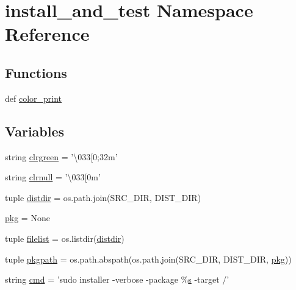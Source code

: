 \hypertarget{namespaceinstall__and__test}{}\section{install\+\_\+and\+\_\+test Namespace Reference}
\label{namespaceinstall__and__test}
\subsection*{Functions}
\begin{DoxyCompactItemize}
\item 
def \hyperlink{namespaceinstall__and__test_ae5a3426c3e84c2b77e7186f16f19b967}{color\+\_\+print}
\end{DoxyCompactItemize}
\subsection*{Variables}
\begin{DoxyCompactItemize}
\item 
string \hyperlink{namespaceinstall__and__test_a25580ed272cd646b63138f91900367cb}{clrgreen} = '\textbackslash{}033\mbox{[}0;32m'
\item 
string \hyperlink{namespaceinstall__and__test_ab5ab2410d2e439ed1dcca0a0c12ac5f0}{clrnull} = '\textbackslash{}033\mbox{[}0m'
\item 
tuple \hyperlink{namespaceinstall__and__test_a8ad1dc9d80932bac8c595bb0c3707e21}{distdir} = os.\+path.\+join(S\+R\+C\+\_\+\+D\+I\+R, D\+I\+S\+T\+\_\+\+D\+I\+R)
\item 
\hyperlink{namespaceinstall__and__test_ac1ad68fc58a71ee216c4926cc5f7ce65}{pkg} = None
\item 
tuple \hyperlink{namespaceinstall__and__test_a26006d6aedea1e311101fcfea1833f27}{filelist} = os.\+listdir(\hyperlink{namespaceinstall__and__test_a8ad1dc9d80932bac8c595bb0c3707e21}{distdir})
\item 
tuple \hyperlink{namespaceinstall__and__test_ab5d67e165fcbe3d0504db021b4ac653a}{pkgpath} = os.\+path.\+abspath(os.\+path.\+join(S\+R\+C\+\_\+\+D\+I\+R, D\+I\+S\+T\+\_\+\+D\+I\+R, \hyperlink{namespaceinstall__and__test_ac1ad68fc58a71ee216c4926cc5f7ce65}{pkg}))
\item 
string \hyperlink{namespaceinstall__and__test_a2caf6de5a61cbc4aef129ef006832bde}{cmd} = 'sudo installer -\/verbose -\/package \%\hyperlink{indexexpr_8h_ae024b0db549122b44c349ae28ec990dc}{s} -\/target /'
\end{DoxyCompactItemize}


